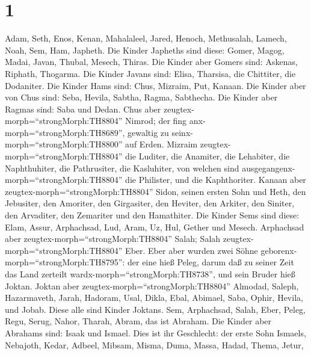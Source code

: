 \hypertarget{section}{%
\section{1}\label{section}}

 Adam, Seth, Enos,  Kenan, Mahalaleel, Jared,
 Henoch, Methusalah, Lamech,  Noah, Sem, Ham,
Japheth.  Die Kinder Japheths sind diese: Gomer, Magog,
Madai, Javan, Thubal, Mesech, Thiras.  Die Kinder aber
Gomers sind: Askenas, Riphath, Thogarma.  Die Kinder Javans
sind: Elisa, Tharsisa, die Chittiter, die Dodaniter.  Die
Kinder Hams sind: Chus, Mizraim, Put, Kanaan.  Die Kinder
aber von Chus sind: Seba, Hevila, Sabtha, Ragma, Sabthecha. Die Kinder
aber Ragmas sind: Saba und Dedan.  Chus aber
zeugtex-morph=``strongMorph:TH8804'' Nimrod; der fing
anx-morph=``strongMorph:TH8689'', gewaltig zu
seinx-morph=``strongMorph:TH8800'' auf Erden.  Mizraim
zeugtex-morph=``strongMorph:TH8804'' die Luditer, die Anamiter, die
Lehabiter, die Naphthuhiter,  die Pathrusiter, die
Kasluhiter, von welchen sind ausgegangenx-morph=``strongMorph:TH8804''
die Philister, und die Kaphthoriter.  Kanaan aber
zeugtex-morph=``strongMorph:TH8804'' Sidon, seinen ersten Sohn und Heth,
 den Jebusiter, den Amoriter, den Girgasiter, 
den Heviter, den Arkiter, den Siniter,  den Arvaditer, den
Zemariter und den Hamathiter.  Die Kinder Sems sind diese:
Elam, Assur, Arphachsad, Lud, Aram, Uz, Hul, Gether und Mesech.
 Arphachsad aber zeugtex-morph=``strongMorph:TH8804''
Salah; Salah zeugtex-morph=``strongMorph:TH8804'' Eber. 
Eber aber wurden zwei Söhne geborenx-morph=``strongMorph:TH8795'': der
eine hieß Peleg, darum daß zu seiner Zeit das Land zerteilt
wardx-morph=``strongMorph:TH8738'', und sein Bruder hieß Joktan.
 Joktan aber zeugtex-morph=``strongMorph:TH8804'' Almodad,
Saleph, Hazarmaveth, Jarah,  Hadoram, Usal, Dikla,
 Ebal, Abimael, Saba,  Ophir, Hevila, und
Jobab. Diese alle sind Kinder Joktans.  Sem, Arphachsad,
Salah,  Eber, Peleg, Regu,  Serug, Nahor,
Tharah,  Abram, das ist Abraham.  Die Kinder
aber Abrahams sind: Isaak und Ismael.  Dies ist ihr
Geschlecht: der erste Sohn Ismaels, Nebajoth, Kedar, Adbeel, Mibsam,
 Misma, Duma, Massa, Hadad, Thema,  Jetur,
